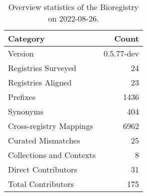 \begin{table}
\centering
\caption{Overview statistics of the Bioregistry on 2022-08-26.}
\label{tab:bioregistry-summary}
\begin{tabular}{lr}
\toprule
                Category &      Count \\
\midrule
                 Version & 0.5.77-dev \\
     Registries Surveyed &         24 \\
      Registries Aligned &         23 \\
                Prefixes &       1436 \\
                Synonyms &        404 \\
 Cross-registry Mappings &       6962 \\
      Curated Mismatches &         25 \\
Collections and Contexts &          8 \\
     Direct Contributors &         31 \\
      Total Contributors &        175 \\
\bottomrule
\end{tabular}
\end{table}
